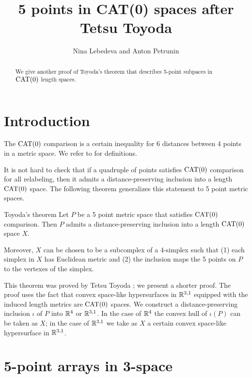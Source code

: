 \documentclass{article}
\begin{document}
\title{5 points in CAT(0) spaces after  Tetsu Toyoda}
\author{Nina Lebedeva and Anton Petrunin}
\date{}
\maketitle
\begin{abstract}
We give another proof of Toyoda's theorem that describes 5-point subpaces in $\mathrm{CAT}(0)$ length spaces.
\end{abstract}

\section{Introduction}

The $\mathrm{CAT}(0)$ comparison is a certain inequality for 6 distances between 4 points in a metric space.
We refer to \cite{alexander-kapovitch-petrunin} for definitions.

It is not hard to check that if a quadruple of points satisfies $\mathrm{CAT}(0)$ comparison for all relabeling,
then it admits a distance-preserving inclusion into a length $\mathrm{CAT}(0)$ space.
The following theorem generalizes this statement to 5 point metric spaces.

\begin{thm}{Toyoda's theorem}
Let $P$ be a 5 point metric space that satisfies $\mathrm{CAT}(0)$ comparison.
Then $P$ admits a distance-preserving inclusion into a length $\mathrm{CAT}(0)$ space $X$.

Moreover,
$X$ can be chosen to be a subcomplex of a 4-simplex such that (1) each simplex in $X$ has Euclidean metric and (2) the inclusion maps the 5 points on $P$ to the vertexes of the simplex.
\end{thm}

This theorem was proved by Tetsu Toyoda \cite{toyoda};
we present a shorter proof.
The proof uses the fact that convex space-like hypersurfaces in $\mathbb{R}^{3,1}$ equipped with the induced length metrics are $\mathrm{CAT}(0)$ spaces.
We construct a distance-preserving inclusion $\iota$ of $P$ into $\mathbb{R}^4$ or $\mathbb{R}^{3,1}$.
In the case of $\mathbb{R}^4$ the convex hull of $\iota(P)$ can be taken as $X$;
in the case of $\mathbb{R}^{3,1}$ we take as $X$ a certain convex space-like hypersurface in $\mathbb{R}^{3,1}$.

\section{5-point arrays in 3-space}
\end{document}

